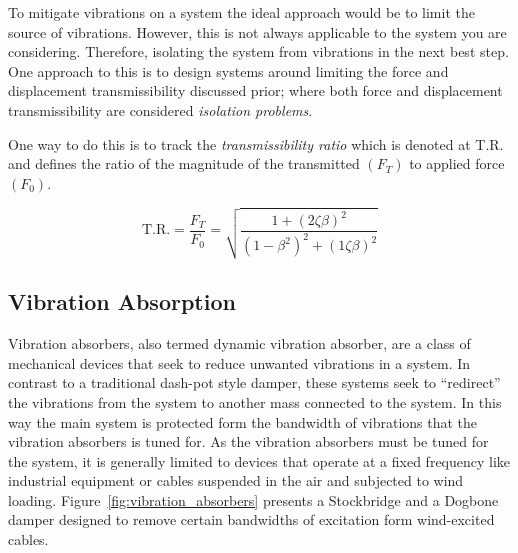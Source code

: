 \documentclass[12pt,letter]{article}
\numberwithin{ex}{section} %
\numberwithin{re}{section} %
\numberwithin{vcs}{section} %
\begin{document}


To mitigate vibrations on a system the ideal approach would be to limit the source of vibrations. However, this is not always applicable to the system you are considering. Therefore, isolating the system from vibrations in the next best step. One approach to this is to design systems around limiting the force and displacement transmissibility discussed prior; where both force and displacement transmissibility  are considered \emph{isolation problems}.

One way to do this is to track the \emph{transmissibility ratio} which is denoted at T.R. and defines the ratio of the magnitude of the transmitted $(F_T)$ to applied force $(F_0)$. 

\begin{equation}
	\text{T.R.} = \frac{F_T}{F_0} = \sqrt{\frac{1+(2 \zeta \beta )^2}{(1-\beta^2)^2+(1 \zeta \beta )^2}}
\end{equation}



\subsection{Vibration Absorption}

Vibration absorbers, also termed dynamic vibration absorber, are a class of mechanical devices that seek to reduce unwanted vibrations in a system. In contrast to a traditional dash-pot style damper, these systems seek to ``redirect'' the vibrations from the system to another mass connected to the system. In this way the main system is protected form the bandwidth of vibrations that the vibration absorbers is tuned for. As the vibration absorbers must be tuned for the system, it is generally limited to devices that operate at a fixed frequency like industrial equipment or cables suspended in the air and subjected to wind loading. Figure~\ref{fig:vibration_absorbers} presents a Stockbridge and a Dogbone damper designed to remove certain bandwidths of excitation form wind-excited cables.
\end{document}
